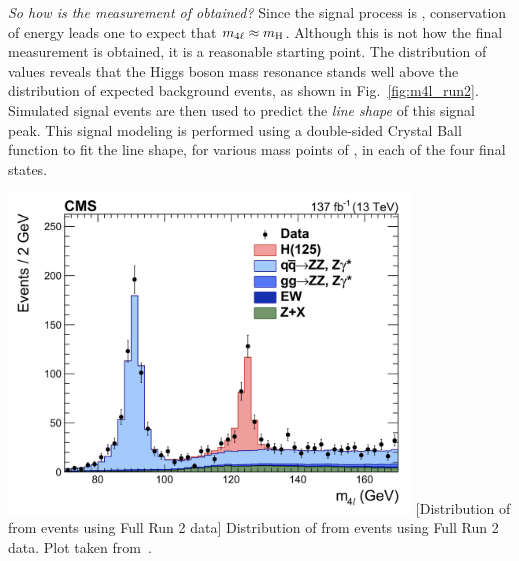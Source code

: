 \emph{So how is the measurement of \mH obtained?}
Since the signal process is \hzzfourl, conservation of energy leads one to expect that $m_{4\ell} \approx m_{\mathrm{H}}$.
Although this is not how the final measurement is obtained, it is a reasonable starting point.
The distribution of \mfourl values reveals that the Higgs boson mass resonance stands well above the distribution of expected background events, as shown in Fig.~\ref{fig:m4l_run2}.
Simulated signal events are then used to predict the \emph{line shape} of this signal peak.
This signal modeling is performed using a double-sided Crystal Ball function to fit the line shape, for various mass points of \mH, in each of the four final states.
\begin{multiFigure}
    \centering
		\includegraphics[width=0.8\textwidth,keepaspectratio]{figures/higgsmassmeas/m4l_FullRun2_epjc.jpeg}
		[Distribution of \mfourl from \hzzfourl events using Full Run 2 data]
		{Distribution of \mfourl from \hzzfourl events using Full Run 2 data.
		Plot taken from~\cite{HIG_19_001}.}
	\label{fig:m4l_run2}
\end{multiFigure}

